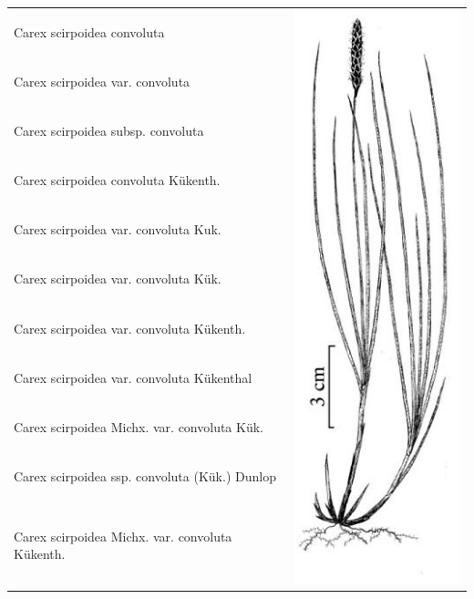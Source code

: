 \documentclass{bmcart}
\begin{document}
\begin{table}[!htb]
\begin{center}
    \begin{tabular}{| l | c |}
    \hline
    Carex scirpoidea convoluta &
    \multirow{24}{*}{\includegraphics[scale=0.3]{images/carex.png}} \\
    Carex scirpoidea var. convoluta & \\
    Carex scirpoidea subsp. convoluta & \\
    Carex scirpoidea convoluta Kükenth. & \\
    Carex scirpoidea var. convoluta Kuk. & \\
    Carex scirpoidea var. convoluta Kük. & \\
    Carex scirpoidea var. convoluta Kükenth. & \\
    Carex scirpoidea var. convoluta Kükenthal & \\
    Carex scirpoidea Michx. var. convoluta Kük. & \\
    Carex scirpoidea ssp. convoluta (Kük.) Dunlop & \\
    Carex scirpoidea Michx. var. convoluta Kükenth. & \\

\end{tabular}
\end{center}
\end{table}
\end{document}
